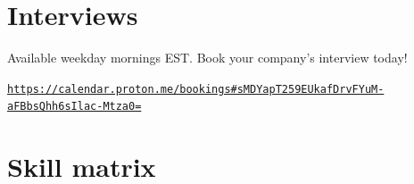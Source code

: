 \documentclass[11pt,letterpaper,sans]{./moderncv/moderncv}
\newcommand{\linkreference}[3]{%
    \href{#1}{\textlangle\texttt{#2}\textrangle}%
}
\begin{document}
\section{Interviews}
Available weekday mornings EST. Book your company's interview today!

\linkreference{https://calendar.proton.me/bookings\#sMDYapT259EUkafDrvFYuM-aFBbsQhh6sIlac-Mtza0=}{https://calendar.proton.me/bookings\#sMDYapT259EUkafDrvFYuM-aFBbsQhh6sIlac-Mtza0=}

\newpage
\makecvhead

\section{Skill matrix}

\setcvskillcolumns[][0.32][]%


\end{document}
